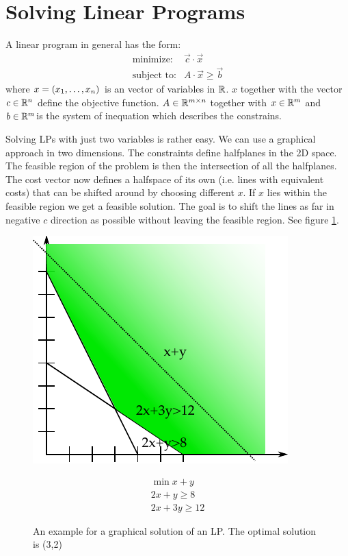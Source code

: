 \section{Solving Linear Programs}
A linear program in general has the form:
\begin{eqnarray*}
\text{minimize:}& \vec c \cdot \vec x \\
\text{subject to:} & A \cdot \vec x \geq \vec b
\end{eqnarray*}
where $x=({x}_1,\ldots,{x}_{n})$ is an vector of variables in $\mathbb{R}$. $x$ together with the vector $c \in \mathbb{R}^n$ define the objective function.
$A \in \mathbb{R}^{m \times n}$ together with $x\in \mathbb{R}^m$ and $b \in \mathbb{R}^m$is the system of inequation which describes the constrains.

Solving LPs with just two variables is rather easy. We can use a graphical approach in two dimensions. The constraints define halfplanes in the 2D space. The feasible region of the problem is then the intersection of all the halfplanes. The cost vector now defines a halfspace of its own (i.e. lines with equivalent costs) that can be shifted around by choosing different $x$. If $x$ lies within the feasible region we get a feasible solution. The goal is to shift the lines as far in negative $c$ direction as possible without leaving the feasible region. See figure \ref{Fig:graphSolutionEx}.

\begin{figure}[hbt]
\begin{minipage}[hbt]{0.4\linewidth}
\includegraphics{./images/graphSolutionEx.pdf}
\end{minipage}
\hfill
\begin{minipage}[hbt]{0.4\linewidth}
\begin{align*}
\min x+y\\
2x+y\geq 8\\
2x+3y\geq 12
\end{align*}
\end{minipage}
\caption{An example for a graphical solution of an LP. The optimal solution is (3,2)}
\label{Fig:graphSolutionEx}
\end{figure}

